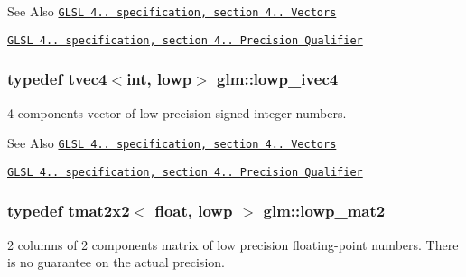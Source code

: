 \begin{DoxySeeAlso}{See Also}
\href{http://www.opengl.org/registry/doc/GLSLangSpec.4.20.8.pdf}{\tt G\-L\-S\-L 4.. specification, section 4.. Vectors} 

\href{http://www.opengl.org/registry/doc/GLSLangSpec.4.20.8.pdf}{\tt G\-L\-S\-L 4.. specification, section 4.. Precision Qualifier} 
\end{DoxySeeAlso}
\hypertarget{group__core__precision_ga863ce958bb6c85ab934feeb4a0da5821}{
\subsubsection[{lowp\-\_\-ivec4}]{\setlength{\rightskip}{0pt plus 5cm}typedef tvec4$<$int, lowp$>$ {\bf glm\-::lowp\-\_\-ivec4}}}\label{group__core__precision_ga863ce958bb6c85ab934feeb4a0da5821}
4 components vector of low precision signed integer numbers.

\begin{DoxySeeAlso}{See Also}
\href{http://www.opengl.org/registry/doc/GLSLangSpec.4.20.8.pdf}{\tt G\-L\-S\-L 4.. specification, section 4.. Vectors} 

\href{http://www.opengl.org/registry/doc/GLSLangSpec.4.20.8.pdf}{\tt G\-L\-S\-L 4.. specification, section 4.. Precision Qualifier} 
\end{DoxySeeAlso}
\hypertarget{group__core__precision_ga2eb6d28afe554e1a2ebc79e3201e8651}{
\subsubsection[{lowp\-\_\-mat2}]{\setlength{\rightskip}{0pt plus 5cm}typedef tmat2x2$<$ float, lowp $>$ {\bf glm\-::lowp\-\_\-mat2}}}\label{group__core__precision_ga2eb6d28afe554e1a2ebc79e3201e8651}
2 columns of 2 components matrix of low precision floating-\/point numbers. There is no guarantee on the actual precision.

